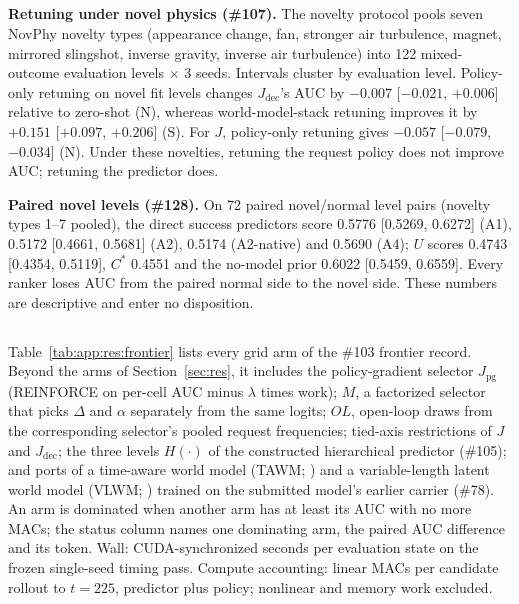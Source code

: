 \subsection{\texorpdfstring{}{Novelty transfer}}
\label{sec:app:res:novelty}

\begin{revblock}
\nopagebreak
\textbf{Retuning under novel physics (\#107).} The novelty protocol pools seven NovPhy novelty types (appearance change, fan, stronger air turbulence, magnet, mirrored slingshot, inverse gravity, inverse air turbulence) into 122 mixed-outcome evaluation levels $\times$ 3 seeds. Intervals cluster by evaluation level. Policy-only retuning on novel fit levels changes $J_{\mathrm{dec}}$'s AUC by $-0.007$ [$-0.021$, $+0.006$] relative to zero-shot (N), whereas world-model-stack retuning improves it by $+0.151$ [$+0.097$, $+0.206$] (S). For $J$, policy-only retuning gives $-0.057$ [$-0.079$, $-0.034$] (N). Under these novelties, retuning the request policy does not improve AUC; retuning the predictor does.

\textbf{Paired novel levels (\#128).} On 72 paired novel/normal level pairs (novelty types 1--7 pooled), the direct success predictors score 0.5776 [0.5269, 0.6272] (A1), 0.5172 [0.4661, 0.5681] (A2), 0.5174 (A2-native) and 0.5690 (A4); $U$ scores 0.4743 [0.4354, 0.5119], $C^{*}$ 0.4551 and the no-model prior 0.6022 [0.5459, 0.6559]. Every ranker loses AUC from the paired normal side to the novel side. These numbers are descriptive and enter no disposition.
\end{revblock}

\subsection{\texorpdfstring{}{Full observed AUC--MAC frontier table}}
\label{sec:app:res:frontier}

\begin{revblock}
\nopagebreak
Table~\ref{tab:app:res:frontier} lists every grid arm of the \#103 frontier record. Beyond the arms of Section~\ref{sec:res}, it includes the policy-gradient selector $J_{\mathrm{pg}}$ (REINFORCE on per-cell AUC minus $\lambda$ times work); $M$, a factorized selector that picks $\Delta$ and $\alpha$ separately from the same logits; $OL$, open-loop draws from the corresponding selector's pooled request frequencies; tied-axis restrictions of $J$ and $J_{\mathrm{dec}}$; the three levels $H(\cdot)$ of the constructed hierarchical predictor (\#105); and ports of a time-aware world model (TAWM; \citealp{nhu2025tawm}) and a variable-length latent world model (VLWM; \citealp{du2026vlwm}) trained on the submitted model's earlier carrier (\#78). An arm is dominated when another arm has at least its AUC with no more MACs; the status column names one dominating arm, the paired AUC difference and its token. Wall: CUDA-synchronized seconds per evaluation state on the frozen single-seed timing pass. Compute accounting: linear MACs per candidate rollout to $t=225$, predictor plus policy; nonlinear and memory work excluded.
\end{revblock}

